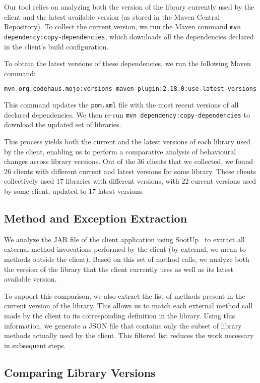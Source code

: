 Our tool relies on analyzing both the version of the library currently used by the client and the latest available version (as stored in the Maven Central Repository). To collect the current version, we run the Maven command \texttt{mvn dependency:copy-dependencies}, which downloads all the dependencies declared in the client's build configuration.

To obtain the latest versions of these dependencies, we run the following Maven command:
\begin{lstlisting}[language=bash, breaklines=true, basicstyle=\ttfamily\small]
mvn org.codehaus.mojo:versions-maven-plugin:2.18.0:use-latest-versions
\end{lstlisting}
This command updates the \texttt{pom.xml} file with the most recent versions of all declared dependencies. We then re-run \texttt{mvn dependency:copy-dependencies} to download the updated set of libraries.

This process yields both the current and the latest versions of each library used by the client, enabling us to perform a comparative analysis of behavioural changes across library versions. Out of the 36 clients that we collected, we found 26 clients with different current and latest versions for some library. These clients collectively used 17 libraries with different versions, with 22 current versions used by some client, updated to 17 latest versions.

\subsection{Method and Exception Extraction}

We analyze the JAR file of the client application using SootUp~\cite{Karakaya24:_sootup} to extract all external method invocations performed by the client (by external, we mean to methods outside the client). Based on this set of method calls, we analyze both the version of the library that the client currently uses as well as its latest available version.

To support this comparison, we also extract the list of methods present in the current version of the library. This allows us to match each external method call made by the client to its corresponding definition in the library. Using this information, we generate a JSON file that contains only the subset of library methods actually used by the client. This filtered list reduces the work necessary in subsequent steps.

\subsection{Comparing Library Versions}

